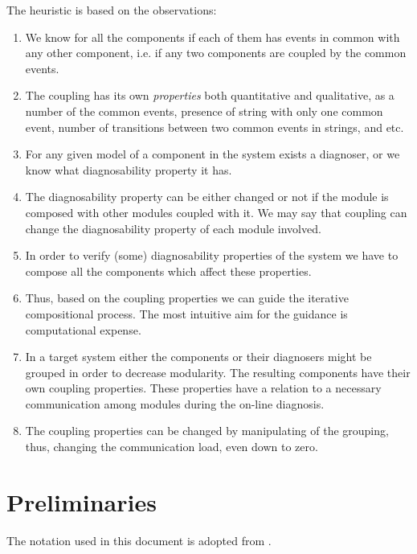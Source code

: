 \documentclass[a4paper,oneside]{article}
\begin{document}
The heuristic is based on the observations:
\begin{enumerate}
  \item We know for all the components if each of them has events in common with
  any other component, i.e. if any two components are coupled by the common
  events.
  \item The coupling has its own \emph{properties} both quantitative and
  qualitative, as a number of the common events, presence of string with only one common event,
  number of transitions between two common events in strings, and etc.
  \item For any given model of a component in the system exists a
  diagnoser, or we know what diagnosability property it has.
  \item The diagnosability property can be either changed or not if the module
  is composed with other modules coupled with it. 
  We may say that coupling can change the diagnosability property of each module
  involved.
  \item In order to verify (some) diagnosability properties of the system we
  have to compose all the components which affect these properties.
  \item Thus, based on the coupling properties we can guide the
  iterative compositional process. The most intuitive aim for the guidance is
  computational expense.
  \item In a target system either the components or their diagnosers might be
  grouped in order to decrease modularity. The resulting components have their
  own coupling properties. These properties have a relation to a
  necessary communication among modules during the on-line diagnosis.
  \item The coupling properties can be changed by manipulating of the grouping,
  thus, changing the communication load, even down to zero.
\end{enumerate}



\section{Preliminaries}
The notation used in this document is adopted from
\cite{cassandras_introduction_2010}.
\end{document}
